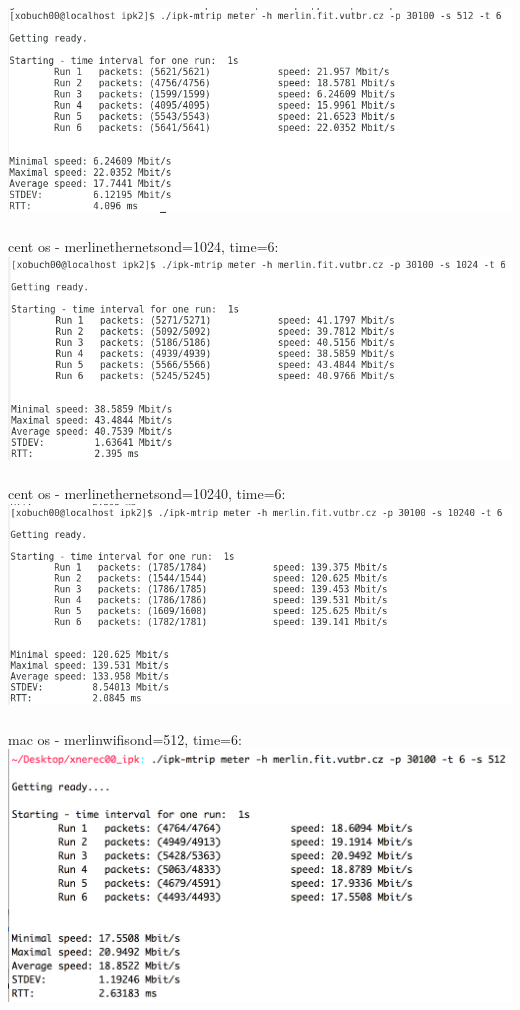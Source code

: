 \documentclass[a4paper, 11pt]{article}
\begin{document}
\includegraphics[scale=0.8]{pic/cent1.png}\\\\
cent os - merlin\qquad ethernet\qquad sond=1024, time=6:\\
\includegraphics[scale=0.8]{pic/cent2.png}\\\\
cent os - merlin\qquad ethernet\qquad sond=10240, time=6:\\
\includegraphics[scale=0.8]{pic/cent3.png}\\\\
\newpage
\noindent mac os - merlin\qquad wifi\qquad sond=512, time=6:\\
\includegraphics[scale=0.2]{pic/mac1.png}\\\\
\end{document}

